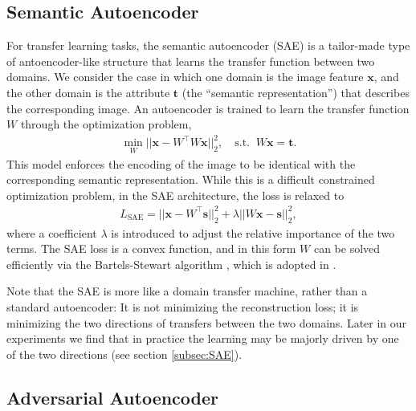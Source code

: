 \documentclass{article}
\newcommand{\bb}[1]{\boldsymbol{#1}}
\begin{document}
\subsection{Semantic Autoencoder}

For transfer learning tasks, the semantic autoencoder (SAE) \cite{kodirov2017semantic} is a tailor-made type of antoencoder-like structure that learns the transfer function between two domains. We consider the case in which one domain is the image feature $\bb{x}$, and the other domain is the attribute $\bb{t}$ (the ``semantic representation'') that describes the corresponding image. An autoencoder is trained to learn the transfer function $W$ through the optimization problem,
	\begin{align}
	\min_{W} || \bb{x} - W^{\top} W \bb{x} ||_2^2, \quad \text{s.t.} \;\; W \bb{x} = \bb{t}.
	\end{align}
	This model enforces the encoding of the image to be identical with the corresponding semantic representation. While this is a difficult constrained optimization problem, in the SAE architecture, the loss is relaxed to
	\begin{align}
	\label{eq:SAELoss} L_{\textrm{SAE}} = || \bb{x} - W^{\top} \bb{s}||_2^2 + \lambda || W \bb{x} - \bb{s} ||_2^2,
	\end{align}
	where a coefficient $\lambda$ is introduced to adjust the relative importance of the two terms. The SAE loss is a convex function, and in this form $W$ can be solved efficiently via the Bartels-Stewart algorithm \cite{lu1971solution}, which is adopted in \cite{kodirov2017semantic}.

	Note that the SAE is more like a domain transfer machine, rather than a standard autoencoder: It is not minimizing the reconstruction loss; it is minimizing the two directions of transfers between the two domains. Later in our experiments we find that in practice the learning may be majorly driven by one of the two directions (see section \ref{subsec:SAE}).



\subsection{Adversarial Autoencoder}
\end{document}

